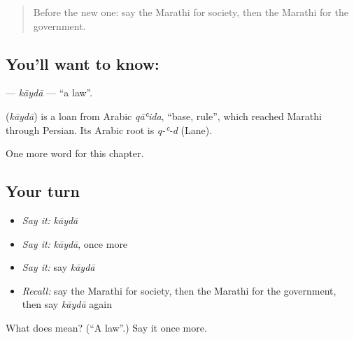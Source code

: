 \label{lesson:MR-C262-kayda}



\begin{quote}
Before the new one: say the Marathi for society, then the Marathi for the government.
\end{quote}

\subsection*{You'll want to know: }
\textbf{} — \emph{kāydā} — \textquotedblleft{}a law\textquotedblright{}.

\begin{cousinweb}
\textbf{} (\emph{kāydā}) is a loan from Arabic \emph{qāʿida}, \textquotedblleft{}base, rule\textquotedblright{}, which reached Marathi through Persian. Its Arabic root is \emph{q-ʿ-d} (Lane).
\end{cousinweb}

\begin{grammarlens}[title={What you've built}]
One more word for this chapter.
\end{grammarlens}

\subsection*{Your turn}
\begin{itemize}
\raggedright
  \item \emph{Say it:} \emph{kāydā}
  \item \emph{Say it:} \emph{kāydā}, once more
  \item \emph{Say it:} say \emph{kāydā}
  \item \emph{Recall:} say the Marathi for society, then the Marathi for the government, then say \emph{kāydā} again
\end{itemize}

\begin{tcolorbox}[breakable,colback=teal!4,colframe=teal!35!black,title={Before you move on}]
What does  mean? (\textquotedblleft{}A law\textquotedblright{}.) Say it once more.
\end{tcolorbox}
